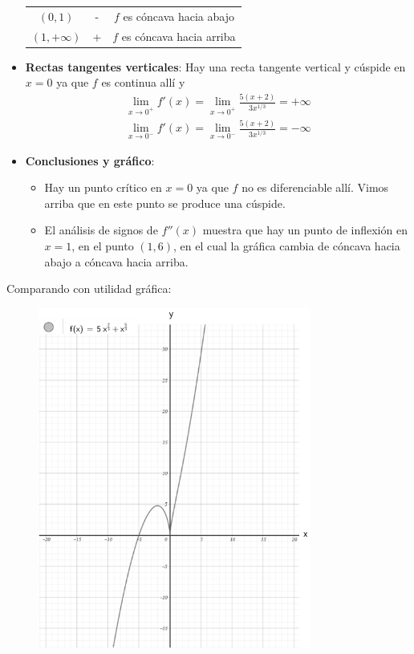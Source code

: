 \documentclass[12pt]{article}
\begin{document}
\begin{itemize}
\begin{table}[H]
\begin{tabular}{c|c|c}
      $(0,1)$ & - & $f$ es cóncava hacia abajo \\
      $(1,+\infty)$ & + & $f$ es cóncava hacia arriba \\
      \hline
    \end{tabular}
  \end{table}
\item \textbf{Rectas tangentes verticales}: Hay una recta tangente vertical y cúspide en $x = 0$ ya que $f$ es continua allí y
  \begin{align*}
    \lim_{x \to 0^+} f'(x) = \lim_{x \to 0^+} \frac{5(x+2)}{3x^{1/3}}  = +\infty \\
    \lim_{x \to 0^-} f'(x) = \lim_{x \to 0^-} \frac{5(x+2)}{3x^{1/3}}  = -\infty 
  \end{align*}
\item \textbf{Conclusiones y gráfico}:
  \begin{itemize}
  \item Hay un punto crítico en $x = 0$ ya que $f$ no es diferenciable allí. Vimos arriba que en este punto se produce una cúspide.
  \item El análisis de signos de $f''(x)$ muestra que hay un punto de inflexión en $x = 1$, en el punto $(1,6)$, en el cual la gráfica cambia de cóncava hacia abajo a cóncava hacia arriba.
  \end{itemize}
\end{itemize}

Comparando con utilidad gráfica:
\begin{figure}[H]
\centering
\includegraphics[width=0.8\textwidth]{../img/img_Lista3/p3_36.png}
\end{figure}
\end{document}
